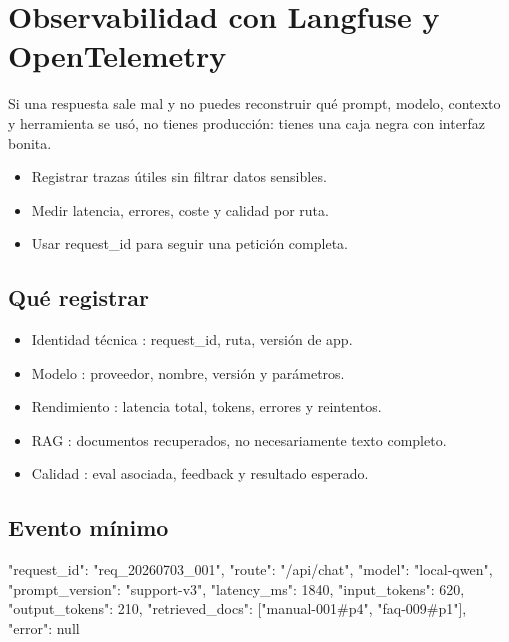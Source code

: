 \documentclass[11pt,a4paper]{book}
\begin{document}
\chapter{Observabilidad con Langfuse y OpenTelemetry}
Si una respuesta sale mal y no puedes reconstruir qué prompt, modelo, contexto y herramienta se usó, no tienes producción: tienes una caja negra con interfaz bonita.

\begin{itemize}\item Registrar trazas útiles sin filtrar datos sensibles.\end{itemize}
\begin{itemize}\item Medir latencia, errores, coste y calidad por ruta.\end{itemize}
\begin{itemize}\item Usar request\_id para seguir una petición completa.\end{itemize}
\section{Qué registrar}
\begin{itemize}\item Identidad técnica : request\_id, ruta, versión de app.\end{itemize}
\begin{itemize}\item Modelo : proveedor, nombre, versión y parámetros.\end{itemize}
\begin{itemize}\item Rendimiento : latencia total, tokens, errores y reintentos.\end{itemize}
\begin{itemize}\item RAG : documentos recuperados, no necesariamente texto completo.\end{itemize}
\begin{itemize}\item Calidad : eval asociada, feedback y resultado esperado.\end{itemize}
\section{Evento mínimo}
\begin{codebox}
{
  "request_id": "req_20260703_001",
  "route": "/api/chat",
  "model": "local-qwen",
  "prompt_version": "support-v3",
  "latency_ms": 1840,
  "input_tokens": 620,
  "output_tokens": 210,
  "retrieved_docs": ["manual-001#p4", "faq-009#p1"],
  "error": null
}
\end{codebox}
\end{document}
